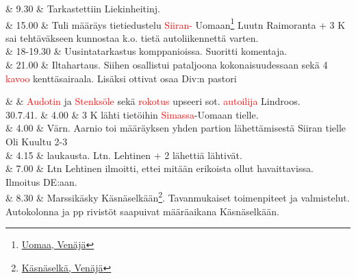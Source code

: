 \documentclass[11pt,a5paper,oneside]{book}
\begin{document}
& 9.30 & Tarkastettiin Liekinheitinj. \newline\newline \\

& 15.00 & Tuli määräys tietiedustelu \textcolor{red}{Siiran-} Uomaan\footnote{\href{https://www.google.fi/maps/place/61\%C2\%B039'46.6\%22N+31\%C2\%B050'57.7\%22E/}{Uomaa, Venäjä}} Luutn Raimoranta + 3 K sai tehtäväkseen kunnostaa k.o. tietä autoliikennettä varten. \newline\newline \\

& 18-19.30 & Uusintatarkastus komppanioissa. \newline Suoritti komentaja. \newline\newline \\

& 21.00 & Iltahartaus. Siihen osallistui pataljoona kokonaisuudessaan sekä 4 \textcolor{red}{kavoo} kenttäsairaala. Lisäksi ottivat osaa Div:n pastori \\
\newpage

& & \textcolor{red}{Audotin} ja \textcolor{red}{Stenksöle} sekä \textcolor{red}{rokotus} upseeri sot. \textcolor{red}{autoilija} Lindroos. \newline\newline\newline\newline\newline \\

30.7.41. & 4.00 & 3 K lähti tietöihin \textcolor{red}{Simassa}-Uomaan tielle. \\

& 4.00 & Värn. Aarnio toi määräyksen yhden partion lähettämisestä Siiran tielle Oli Kuultu 2-3 \\

& 4.15 & laukausta. Ltn. Lehtinen + 2 lähettiä lähtivät. \\

& 7.00 & Ltn Lehtinen ilmoitti, ettei mitään erikoista ollut havaittavissa. Ilmoitus DE:aan. \\

& 8.30 & Marssikäsky Käsnäselkään\footnote{\href{https://www.google.fi/maps/place/Derevnya+Kyasnyasel'kya,+Republic+of+Karelia,+Russia,+186148/}{Käsnäselkä, Venäjä}}. Tavanmukaiset toimenpiteet ja valmistelut. Autokolonna ja pp rivistöt saapuivat määräaikana Käsnäselkään. \\
\end{document}

